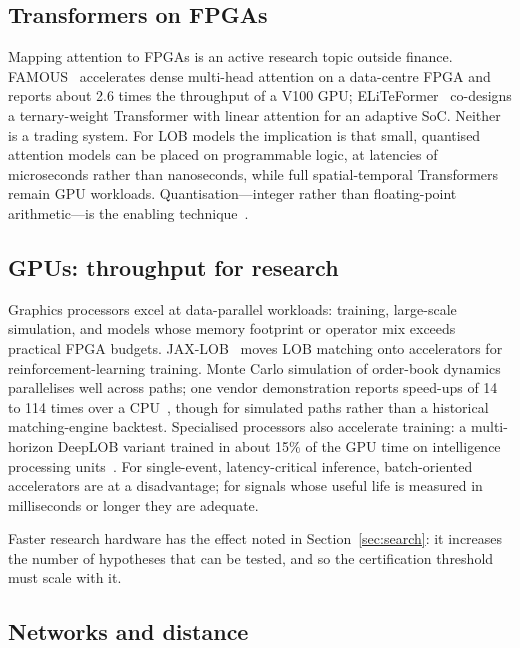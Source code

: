\subsection{Transformers on FPGAs}

Mapping attention to FPGAs is an active research topic outside finance. FAMOUS~\citep{famous}
accelerates dense multi-head attention on a data-centre FPGA and reports about 2.6 times the throughput
of a V100 GPU; ELiTeFormer~\citep{eliteformer} co-designs a ternary-weight Transformer with linear
attention for an adaptive SoC. Neither is a trading system. For LOB models the implication is that
small, quantised attention models can be placed on programmable logic, at latencies of microseconds
rather than nanoseconds, while full spatial-temporal Transformers remain GPU workloads.
Quantisation---integer rather than floating-point arithmetic---is the enabling
technique~\citep{jacob2018}.

\subsection{GPUs: throughput for research}

Graphics processors excel at data-parallel workloads: training, large-scale simulation, and models
whose memory footprint or operator mix exceeds practical FPGA budgets. JAX-LOB~\citep{frey2023}
moves LOB matching onto accelerators for reinforcement-learning training. Monte Carlo simulation
of order-book dynamics parallelises well across paths; one vendor demonstration reports speed-ups of
14 to 114 times over a CPU~\citep{nvidia_numba2025}, though for simulated paths rather than a
historical matching-engine backtest. Specialised processors also accelerate training: a multi-horizon
DeepLOB variant trained in about 15\% of the GPU time on intelligence processing
units~\citep{zhangzohren2021}. For single-event,
latency-critical inference, batch-oriented accelerators are at a disadvantage; for signals whose
useful life is measured in milliseconds or longer they are adequate.

Faster research hardware has the effect noted in Section~\ref{sec:search}: it increases the number
of hypotheses that can be tested, and so the certification threshold must scale with it.

\subsection{Networks and distance}

